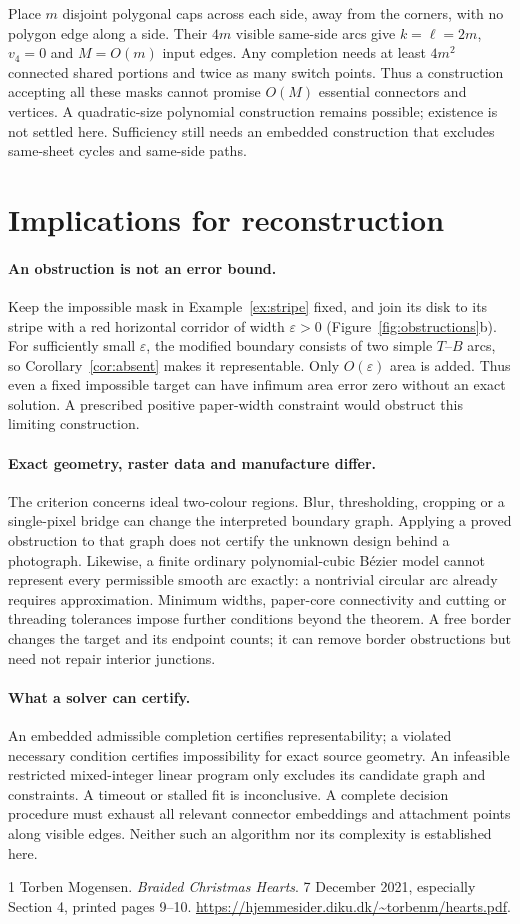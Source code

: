 \documentclass[11pt,a4paper]{article}
\theoremstyle{definition}
\begin{document}
Place $m$ disjoint polygonal caps across each side, away from the corners,
with no polygon edge along a side. Their $4m$ visible same-side arcs give
$k=\ell=2m$, $v_4=0$ and $M=O(m)$ input edges. Any completion needs at least
$4m^2$ connected shared portions and twice as many switch points.
Thus a construction accepting all these masks cannot promise $O(M)$ essential
connectors and vertices. A quadratic-size polynomial construction remains
possible; existence is not settled here. Sufficiency still needs an embedded
construction that excludes same-sheet cycles and same-side paths.

\section{Implications for reconstruction}
\paragraph{An obstruction is not an error bound.}
Keep the impossible mask in Example~\ref{ex:stripe} fixed, and join its disk
to its stripe with a red horizontal corridor of width $\varepsilon>0$
(Figure~\ref{fig:obstructions}b).
For sufficiently small $\varepsilon$, the modified boundary consists of two
simple $T$--$B$ arcs, so Corollary~\ref{cor:absent} makes it representable.
Only $O(\varepsilon)$ area is added. Thus even a fixed impossible target can
have infimum area error zero without an exact solution. A prescribed positive
paper-width constraint would obstruct this limiting construction.

\paragraph{Exact geometry, raster data and manufacture differ.}
The criterion concerns ideal two-colour regions. Blur, thresholding, cropping
or a single-pixel bridge can change the interpreted boundary graph. Applying
a proved obstruction to that graph does not certify the unknown design behind
a photograph. Likewise, a finite ordinary polynomial-cubic B\'ezier model
cannot represent every permissible smooth arc exactly: a nontrivial circular
arc already requires approximation. Minimum widths, paper-core connectivity
and cutting or threading tolerances impose further conditions beyond the
theorem. A free border changes the target and its endpoint counts; it can
remove border obstructions but need not repair interior junctions.

\paragraph{What a solver can certify.}
An embedded admissible completion certifies representability; a violated
necessary condition certifies impossibility for exact source geometry.
An infeasible restricted mixed-integer linear program only excludes its
candidate graph and constraints.
A timeout or stalled fit is inconclusive. A complete decision procedure must
exhaust all relevant connector embeddings and attachment points along visible
edges. Neither such an algorithm nor its complexity is established here.

\begin{thebibliography}{1}
Torben Mogensen.
\emph{Braided Christmas Hearts}.
7 December 2021, especially Section 4, printed pages 9--10.
\url{https://hjemmesider.diku.dk/~torbenm/hearts.pdf}.
\end{thebibliography}
\end{document}
